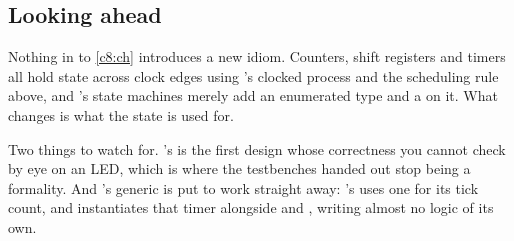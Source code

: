 \subsection*{Looking ahead}
Nothing in  to \ref{c8:ch} introduces a new idiom. Counters, shift registers and
timers all hold state across clock edges using 's clocked process and the scheduling
rule above, and 's state machines merely add an enumerated type and a  on
it. What changes is what the state is used for.

Two things to watch for. 's  is the first design whose correctness
you cannot check by eye on an LED, which is where the testbenches handed out stop being a
formality. And 's generic is put to work straight away: 's
 uses one for its tick count, and  instantiates that timer alongside
 and , writing almost no logic of its own.
